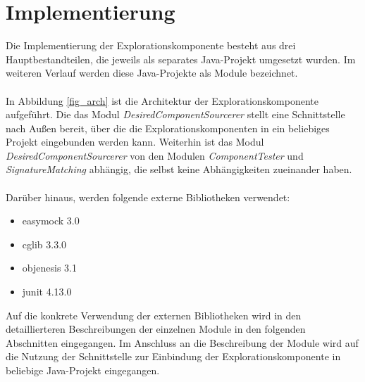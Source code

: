 \chapter{Implementierung}
Die Implementierung der Explorationskomponente besteht aus drei Hauptbestandteilen, die jeweils als separates Java-Projekt umgesetzt wurden. Im weiteren Verlauf werden diese Java-Projekte als Module bezeichnet.
\\\\
In Abbildung \ref{fig_arch} ist die Architektur der Explorationskomponente aufgeführt. Die das Modul \emph{DesiredComponentSourcerer} stellt eine Schnittstelle nach Außen bereit, über die die Explorationskomponenten in ein beliebiges Projekt eingebunden werden kann. Weiterhin ist das Modul \emph{DesiredComponentSourcerer} von den Modulen \emph{ComponentTester} und \emph{SignatureMatching} abhängig, die selbst keine Abhängigkeiten zueinander haben.
\\\\
Darüber hinaus, werden folgende externe Bibliotheken verwendet:
\begin{itemize}
\item easymock 3.0 \cite{easymock}
\item cglib 3.3.0 \cite{cglib}
\item objenesis 3.1 \cite{objenesis}
\item junit 4.13.0 \cite{junit}
\end{itemize}
Auf die konkrete Verwendung der externen Bibliotheken wird in den detaillierteren Beschreibungen der einzelnen Module in den folgenden Abschnitten eingegangen. Im Anschluss an die Beschreibung der Module wird auf die Nutzung der Schnittstelle zur Einbindung der Explorationskomponente in beliebige Java-Projekt eingegangen.
